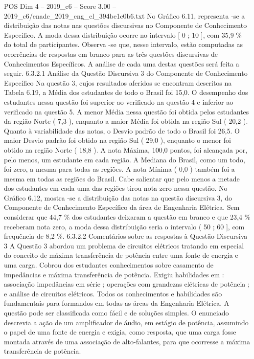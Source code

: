 \begin{textsample}{POS Dim 4 – 2019\_c6 – Score 3.00 – 2019\_c6/enade\_2019\_eng\_el\_394be1c0b6.txt}
No Gráfico 6.11, representa -se a distribuição das notas nas questões discursivas no Componente de Conhecimento Específico.
A moda dessa distribuição ocorre no intervalo [ 0 ; 10 ], com 35,9 \% do total de participantes.
Observa -se que, nesse intervalo, estão computadas as ocorrências de respostas em branco para as três questões discursivas de Conhecimentos Específicos.
A análise de cada uma destas questões será feita a seguir. 6.3.2.1 Análise da Questão Discursiva 3 do Componente de Conhecimento Específico Na questão 3, cujos resultados aferidos se encontram descritos na Tabela 6.19, a Média dos estudantes de todo o Brasil foi 15,0.
O desempenho dos estudantes nessa questão foi superior ao verificado na questão 4 e inferior ao verificado na questão 5.
A menor Média nessa questão foi obtida pelos estudantes da região Norte ( 7,3 ), enquanto a maior Média foi obtida na região Sul ( 20,2 ).
Quanto à variabilidade das notas, o Desvio padrão de todo o Brasil foi 26,5.
O maior Desvio padrão foi obtido na região Sul ( 29,0 ), enquanto o menor foi obtido na região Norte ( 18,8 ).
A nota Máxima, 100,0 pontos, foi alcançada por, pelo menos, um estudante em cada região.
A Mediana do Brasil, como um todo, foi zero, a mesma para todas as regiões.
A nota Mínima ( 0,0 ) também foi a mesma em todas as regiões do Brasil.
Cabe salientar que pelo menos a metade dos estudantes em cada uma das regiões tirou nota zero nessa questão.
No Gráfico 6.12, mostra -se a distribuição das notas na questão discursiva 3, do Componente de Conhecimento Específico da área de Engenharia Elétrica.
Sem considerar que 44,7 \% dos estudantes deixaram a questão em branco e que 23,4 \% receberam nota zero, a moda dessa distribuição seria o intervalo ( 50 ; 60 ], com frequência de 8,2 \%. 6.3.2.2 Comentários sobre as respostas à Questão Discursiva 3 A Questão 3 abordou um problema de circuitos elétricos tratando em especial do conceito de máxima transferência de potência entre uma fonte de energia e uma carga.
Cobrou dos estudantes conhecimentos sobre casamento de impedâncias e máxima transferência de potência.
Exigiu habilidades em : associação impedâncias em série ; operações com grandezas elétricas de potência ; e análise de circuitos elétricos.
Todos os conhecimentos e habilidades são fundamentais para formandos em todas as áreas da Engenharia Elétrica.
A questão pode ser classificada como fácil e de soluções simples.
O enunciado descrevia a ação de um amplificador de áudio, em estágio de potência, assumindo o papel de uma fonte de energia e exigia, como resposta, que uma carga fosse montada através de uma associação de alto-falantes, para que ocorresse a máxima transferência de potência.

\end{textsample}
